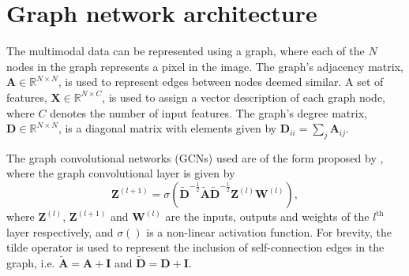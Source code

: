 \documentclass[
twocolumn,
]{ceurart}
\begin{document}
\section{Graph network architecture}
\label{sec::GraphNetworkArchitecture}
The multimodal data can be represented using a graph, where each of the $N$ nodes in the graph represents a pixel in the image.
The graph's adjacency matrix, $\mathbf{A}\in\mathbb{R}^{N\times N}$, is used to represent edges between nodes deemed similar.
A set of features, $\mathbf{X}\in\mathbb{R}^{N\times C}$, is used to assign a vector description of each graph node, where $C$ denotes the number of input features.
The graph's degree matrix, $\mathbf{D}\in\mathbb{R}^{N\times N}$, is a diagonal matrix with elements given by $\mathbf{D}_{ii}=\sum_j\mathbf{A}_{ij} $.

The graph convolutional networks (GCNs) used are of the form proposed by \cite{Kipf2017}, where the graph convolutional layer is given by
\begin{equation}
    \mathbf{Z}^{(l+1)}=\sigma\left(\tilde{\mathbf{D}}^{-\frac{1}{2}}\tilde{\mathbf{A}}\tilde{\mathbf{D}}^{-\frac{1}{2}}\mathbf{Z}^{(l)}\boldsymbol{W}^{(l)}\right),
\label{eq::gcn_layer}
\end{equation}
where $\mathbf{Z}^{(l)}$, $\mathbf{Z}^{(l+1)}$ and $\boldsymbol{W}^{(l)}$ are the inputs, outputs and weights of the $l^\textrm{th}$ layer respectively, and $\sigma()$ is a non-linear activation function.
For brevity, the tilde operator is used to represent the inclusion of self-connection edges in the graph, i.e. $\tilde{\mathbf{A}}=\mathbf{A}+\mathbf{I}$ and $\tilde{\mathbf{D}}=\mathbf{D}+\mathbf{I}$.
\end{document}
